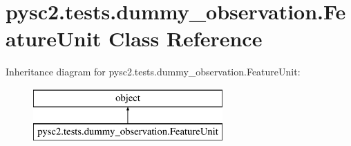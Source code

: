 \hypertarget{classpysc2_1_1tests_1_1dummy__observation_1_1_feature_unit}{}\section{pysc2.\+tests.\+dummy\+\_\+observation.\+Feature\+Unit Class Reference}
\label{classpysc2_1_1tests_1_1dummy__observation_1_1_feature_unit}
Inheritance diagram for pysc2.\+tests.\+dummy\+\_\+observation.\+Feature\+Unit\+:\begin{figure}[H]
\begin{center}
\leavevmode
\includegraphics[height=2.000000cm]{classpysc2_1_1tests_1_1dummy__observation_1_1_feature_unit}
\end{center}
\end{figure}
